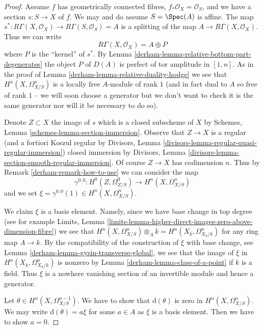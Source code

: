 \begin{proof}
\medskip\noindent
Assume $f$ has geometrically connected fibres,
$f_*\mathcal{O}_X = \mathcal{O}_S$, and we have
a section $s : S \to X$ of $f$. We may and do assume $S = \Spec(A)$
is affine. The map
$s^* : R\Gamma(X, \mathcal{O}_X) \to R\Gamma(S, \mathcal{O}_S) = A$
is a splitting of the map $A \to R\Gamma(X, \mathcal{O}_X)$. Thus we can write
$$
R\Gamma(X, \mathcal{O}_X) = A \oplus P
$$
where $P$ is the ``kernel'' of $s^*$. By
Lemma \ref{derham-lemma-relative-bottom-part-degenerates} the object $P$
of $D(A)$ is perfect of tor amplitude in $[1, n]$. As in the proof
of Lemma \ref{derham-lemma-relative-duality-hodge} we see that
$H^n(X, \Omega^n_{X/S})$ is a locally free $A$-module of rank $1$
(and in fact dual to $A$ so free of rank $1$ -- we will soon choose
a generator but we don't want to check it is the same generator
nor will it be necessary to do so).

\medskip\noindent
Denote $Z \subset X$ the image of $s$ which is a closed subscheme of $X$ by
Schemes, Lemma \ref{schemes-lemma-section-immersion}.
Observe that $Z \to X$ is a regular (and a fortiori Koszul regular by
Divisors, Lemma \ref{divisors-lemma-regular-quasi-regular-immersion})
closed immersion by
Divisors, Lemma \ref{divisors-lemma-section-smooth-regular-immersion}.
Of course $Z \to X$ has codimension $n$. Thus by
Remark \ref{derham-remark-how-to-use}
we can consider the map
$$
\gamma^{0, 0} : H^0(Z, \Omega^0_{Z/S}) \longrightarrow H^n(X, \Omega^n_{X/S})
$$
and we set $\xi = \gamma^{0, 0}(1) \in H^n(X, \Omega^n_{X/S})$.

\medskip\noindent
We claim $\xi$ is a basis element. Namely, since we have base change in
top degree (see for example Limits, Lemma
\ref{limits-lemma-higher-direct-images-zero-above-dimension-fibre})
we see that
$H^n(X, \Omega^n_{X/S}) \otimes_A k = H^n(X_k, \Omega^n_{X_k/k})$
for any ring map $A \to k$. By the compatibility of
the construction of $\xi$ with base change,
see Lemma \ref{derham-lemma-gysin-transverse-global},
we see that the image of $\xi$ in $H^n(X_k, \Omega^n_{X_k/k})$
is nonzero by Lemma \ref{derham-lemma-class-of-a-point} if $k$ is a field.
Thus $\xi$ is a nowhere vanishing section of an invertible module
and hence a generator.

\medskip\noindent
Let $\theta \in H^n(X, \Omega^{n - 1}_{X/S})$. We have to show that
$\text{d}(\theta)$ is zero in $H^n(X, \Omega^n_{X/S})$.
We may write $\text{d}(\theta) = a \xi$ for some $a \in A$
as $\xi$ is a basis element. Then we have to show $a = 0$.


\end{proof}
